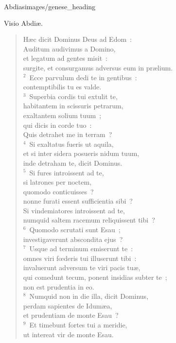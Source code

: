 {Abdias}{images/genese_heading}

\noindent Visio Abdi\ae . \begin{verse}\vspace{6pt}H\ae c dicit Dominus Deus ad Edom~:\\ Auditum audivimus a Domino,\\ et legatum ad gentes misit~:\\ surgite, et consurgamus adversus eum in pr\ae lium.\\
${}^{2}$~Ecce parvulum dedi te in gentibus~:\\ contemptibilis tu es valde.\\
${}^{3}$~Superbia cordis tui extulit te,\\ habitantem in scissuris petrarum,\\ exaltantem solium tuum~;\\ qui dicis in corde tuo~:\\ Quis detrahet me in terram~?\\
${}^{4}$~Si exaltatus fueris ut aquila,\\ et si inter sidera posueris nidum tuum,\\ inde detraham te, dicit Dominus.\\
${}^{5}$~Si fures introissent ad te,\\ si latrones per noctem,\\ quomodo conticuisses~?\\ nonne furati essent sufficientia sibi~?\\ Si vindemiatores introissent ad te,\\ numquid saltem racemum reliquissent tibi~?\\
${}^{6}$~Quomodo scrutati sunt Esau~;\\ investigaverunt abscondita ejus~?\\
${}^{7}$~Usque ad terminum emiserunt te~:\\ omnes viri fœderis tui illuserunt tibi~:\\ invaluerunt adversum te viri pacis tu\ae ,\\ qui comedunt tecum, ponent insidias subter te~;\\ non est prudentia in eo.\\
${}^{8}$~Numquid non in die illa, dicit Dominus,\\ perdam sapientes de Idum\ae a,\\ et prudentiam de monte Esau~?\\
${}^{9}$~Et timebunt fortes tui a meridie,\\ ut intereat vir de monte Esau.\\

\end{verse}
